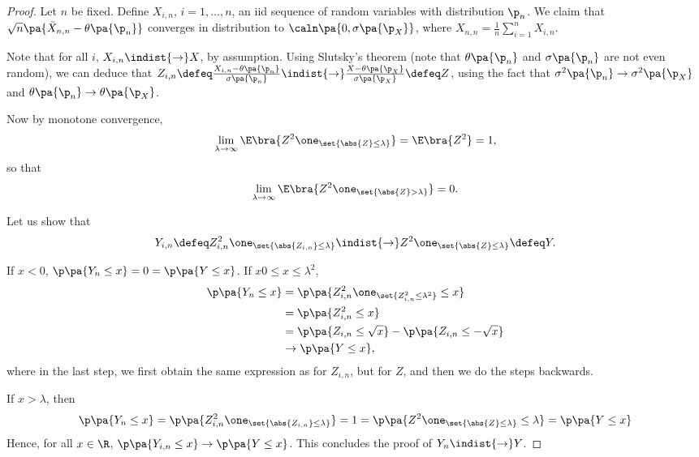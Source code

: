 \begin{proof} Let $n$ be fixed.
  Define $X_{i,n}$, $i=1,\ldots, n$, an iid sequence of random variables with distribution $\p_n$. We claim that $\sqrt{n}\pa{\bar{X}_{n,n}- \theta\pa{\p_n}}$ converges in distribution to $\caln \pa{0,\sigma\pa{\p_X}}$, where $X_{n,n} = \frac{1}{n}\sum_{i=1}^n X_{i,n}$.

  Note that for all $i$, $X_{i,n}\indist{\rightarrow} X$, by assumption. Using Slutsky's theorem (note that $\theta\pa{\p_n}$ and $\sigma\pa{\p_n}$ are not even random), we can deduce that $Z_{i,n} \defeq \frac{X_{i,n}- \theta\pa{\p_n}}{\sigma\pa{\p_n}}\indist{\rightarrow} \frac{X- \theta\pa{\p_X}}{\sigma\pa{\p_X}}\defeq Z$, using the fact that $\sigma^2\pa{\p_n}\rightarrow \sigma^2\pa{\p_X}$ and $\theta\pa{\p_n}\rightarrow \theta\pa{\p_X}$.

  Now by monotone convergence,
  \begin{equation}
    \lim_{\lambda\rightarrow \infty }\E\bra{Z^2\one_{\set{\abs{Z}\leq \lambda }}} = \E\bra{Z^2} =1,
  \end{equation}
  so that
  \begin{equation}
    \lim_{\lambda\rightarrow \infty} \E\bra{Z^2\one_{\set{\abs{Z}>\lambda}}} = 0.
  \end{equation}

  Let us show that
  \begin{equation}
    Y_{i,n}\defeq  Z_{i,n}^2 \one_{\set{\abs{Z_{i,n}}\leq \lambda}}\indist{\rightarrow} Z^2\one_{\set{\abs{Z}\leq \lambda}}\defeq Y.
  \end{equation}

  If $x< 0$, $\p\pa{Y_n\leq x} = 0 = \p\pa{Y\leq x}$. If $x0\leq x \leq \lambda^2 $,
  \begin{equation}
  \begin{split}
    \p\pa{Y_n\leq x } &= \p\pa{Z_{i,n}^2 \one_{\set{Z_{i,n}^2 \leq \lambda^2 }}\leq x} \\
    &= \p\pa{Z_{i,n}^2 \leq x}\\
    &=\p\pa{Z_{i,n}\leq \sqrt{x}}- \p\pa{Z_{i,n}\leq -\sqrt{x}} \\
    &\rightarrow \p\pa{Y\leq x},
    \end{split}
  \end{equation}
  where in the last step, we first obtain the same expression as for $Z_{i,n}$, but for $Z$, and then we do the steps backwards.

  If $x>\lambda$, then
  \begin{equation}
  \p\pa{Y_n\leq x} = \p\pa{Z_{i,n}^2 \one_{\set{\abs{Z_{i,n}}\leq \lambda }}} = 1 = \p\pa{Z^2 \one_{\set{\abs{Z}\leq \lambda}}\leq \lambda} = \p\pa{Y\leq x}
  \end{equation}
  Hence, for all $x\in \R$, $\p\pa{Y_{i,n}\leq x}\rightarrow \p\pa{Y\leq x}$. This concludes the proof of $Y_n\indist{\rightarrow} Y$.


\end{proof}
